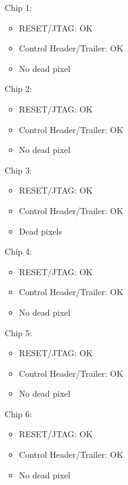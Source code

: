 \documentclass[a4papper, 10pt]{article}
\begin{document}
     \begin{itemize}
       \item[Chip 1:]
         \begin{itemize}
            \item RESET/JTAG: OK
            \item Control Header/Trailer: OK
            \item No dead pixel
         \end{itemize}  
       \item[Chip 2:]
         \begin{itemize}
            \item RESET/JTAG: OK
            \item Control Header/Trailer: OK
            \item No dead pixel
         \end{itemize}  
       \item[Chip 3:]
         \begin{itemize}
            \item RESET/JTAG: OK
            \item Control Header/Trailer: OK
            \item Dead pixels
         \end{itemize}  
       \item[Chip 4:]
         \begin{itemize}
            \item RESET/JTAG: OK
            \item Control Header/Trailer: OK
            \item No dead pixel
         \end{itemize}  
       \item[Chip 5:]
         \begin{itemize}
            \item RESET/JTAG: OK
            \item Control Header/Trailer: OK
            \item No dead pixel
         \end{itemize}  
       \item[Chip 6:]
         \begin{itemize}
            \item RESET/JTAG: OK
            \item Control Header/Trailer: OK
            \item No dead pixel
         \end{itemize}  
     \end{itemize}
\end{document}
